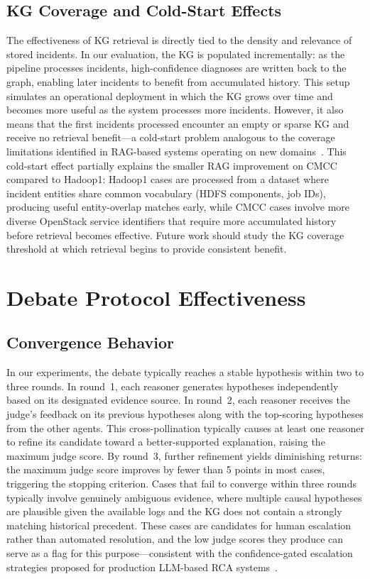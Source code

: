 \subsection{KG Coverage and Cold-Start Effects}

The effectiveness of KG retrieval is directly tied to the density and relevance of stored
incidents. In our evaluation, the KG is populated incrementally: as the pipeline processes
incidents, high-confidence diagnoses are written back to the graph, enabling later incidents to
benefit from accumulated history. This setup simulates an operational deployment in which the KG
grows over time and becomes more useful as the system processes more incidents. However, it also
means that the first incidents processed encounter an empty or sparse KG and receive no retrieval
benefit---a cold-start problem analogous to the coverage limitations identified in RAG-based
systems operating on new domains~\cite{lewis2021retrievalaugmentedgenerationknowledgeintensivenlp}.
This cold-start effect partially explains the smaller RAG improvement on CMCC compared to Hadoop1:
Hadoop1 cases are processed from a dataset where incident entities share common vocabulary (HDFS
components, job IDs), producing useful entity-overlap matches early, while CMCC cases involve
more diverse OpenStack service identifiers that require more accumulated history before retrieval
becomes effective. Future work should study the KG coverage threshold at which retrieval begins
to provide consistent benefit.

\section{Debate Protocol Effectiveness}

\subsection{Convergence Behavior}

In our experiments, the debate typically reaches a stable hypothesis within two to three rounds.
In round~1, each reasoner generates hypotheses independently based on its designated evidence
source. In round~2, each reasoner receives the judge's feedback on its previous hypotheses along
with the top-scoring hypotheses from the other agents. This cross-pollination typically causes
at least one reasoner to refine its candidate toward a better-supported explanation, raising the
maximum judge score. By round~3, further refinement yields diminishing returns: the maximum
judge score improves by fewer than 5 points in most cases, triggering the stopping criterion.
Cases that fail to converge within three rounds typically involve genuinely ambiguous evidence,
where multiple causal hypotheses are plausible given the available logs and the KG does not
contain a strongly matching historical precedent. These cases are candidates for human escalation
rather than automated resolution, and the low judge scores they produce can serve as a flag for
this purpose---consistent with the confidence-gated escalation strategies proposed for
production LLM-based RCA systems~\cite{chen2024rcacopilot}.

